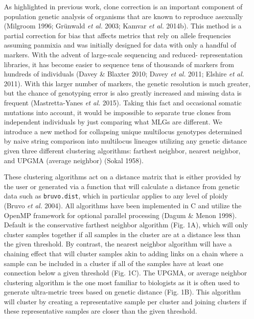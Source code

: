 \documentclass[double,12pt]{beavtex}
\begin{document}
  As highlighted in previous work, clone correction is an important
  component of population genetic analysis of organisms that are known to
  reproduce asexually (Milgroom 1996; Grünwald \emph{et al.} 2003; Kamvar
  \emph{et al.} 2014b). This method is a partial correction for bias that
  affects metrics that rely on allele frequencies assuming panmixia and
  was initially designed for data with only a handful of markers. With the
  advent of large-scale sequencing and reduced- representation libraries,
  it has become easier to sequence tens of thousands of markers from
  hundreds of individuals (Davey \& Blaxter 2010; Davey \emph{et al.}
  2011; Elshire \emph{et al.} 2011). With this larger number of markers,
  the genetic resolution is much greater, but the chance of genotyping
  error is also greatly increased and missing data is frequent
  (Mastretta-Yanes \emph{et al.} 2015). Taking this fact and occasional
  somatic mutations into account, it would be impossible to separate true
  clones from independent individuals by just comparing what MLGs are
  different. We introduce a new method for collapsing unique multilocus
  genotypes determined by naive string comparison into multilocus lineages
  utilizing any genetic distance given three different clustering
  algorithms: farthest neighbor, nearest neighbor, and UPGMA (average
  neighbor) (Sokal 1958).
  
  These clustering algorithms act on a distance matrix that is either
  provided by the user or generated via a function that will calculate a
  distance from genetic data such as \texttt{bruvo.dist}, which in
  particular applies to any level of ploidy (Bruvo \emph{et al.} 2004).
  All algorithms have been implemented in C and utilize the OpenMP
  framework for optional parallel processing (Dagum \& Menon 1998).
  Default is the conservative farthest neighbor algorithm (Fig. 1A), which
  will only cluster samples together if all samples in the cluster are at
  a distance less than the given threshold. By contrast, the nearest
  neighbor algorithm will have a chaining effect that will cluster samples
  akin to adding links on a chain where a sample can be included in a
  cluster if all of the samples have at least one connection below a given
  threshold (Fig. 1C). The UPGMA, or average neighbor clustering algorithm
  is the one most familiar to biologists as it is often used to generate
  ultra-metric trees based on genetic distance (Fig. 1B). This algorithm
  will cluster by creating a representative sample per cluster and joining
  clusters if these representative samples are closer than the given
  threshold.
  
\end{document}

